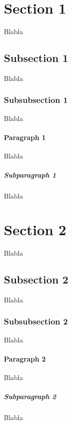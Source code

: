 \section{Section 1}
Blabla
\subsection{Subsection 1}
Blabla
\subsubsection{Subsubsection 1}
Blabla
\paragraph{Paragraph 1}
Blabla
\subparagraph{Subparagraph 1}
Blabla
\section{Section 2}
Blabla
\subsection{Subsection 2}
Blabla
\subsubsection{Subsubsection 2}
Blabla
\paragraph{Paragraph 2}
Blabla
\subparagraph{Subparagraph 2}
Blabla